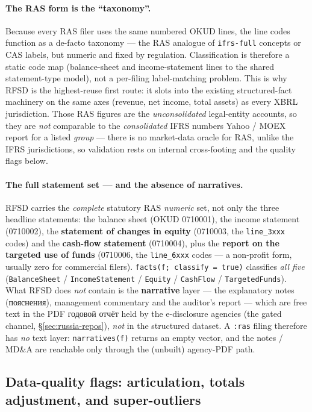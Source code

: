 \documentclass[11pt,a4paper]{report}
\newcommand{\rus}[1]{{\rusfont #1}}
\begin{document}
\paragraph{The RAS form is the ``taxonomy''.} Because every RAS filer uses the same numbered OKUD lines, the
line codes function as a de-facto taxonomy --- the RAS analogue of \texttt{ifrs-full} concepts or CAS labels,
but numeric and fixed by regulation. Classification is therefore a static code map (balance-sheet and
income-statement lines to the shared statement-type model), not a per-filing label-matching problem. This is
why RFSD is the highest-reuse first route: it slots into the existing structured-fact machinery on the same
axes (revenue, net income, total assets) as every XBRL jurisdiction. Those RAS figures are the
\emph{unconsolidated} legal-entity accounts, so they are \emph{not} comparable to the \emph{consolidated}
IFRS numbers Yahoo / MOEX report for a listed \emph{group} --- there is no market-data oracle for RAS,
unlike the IFRS jurisdictions, so validation rests on internal cross-footing and the quality flags below.

\paragraph{The full statement set --- and the absence of narratives.} RFSD carries the \emph{complete}
statutory RAS \emph{numeric} set, not only the three headline statements: the balance sheet (OKUD 0710001),
the income statement (0710002), the \textbf{statement of changes in equity} (0710003, the \texttt{line\_3xxx}
codes) and the \textbf{cash-flow statement} (0710004), plus the \textbf{report on the targeted use of funds}
(0710006, the \texttt{line\_6xxx} codes --- a non-profit form, usually zero for commercial filers).
\texttt{facts(f; classify = true)} classifies \emph{all five} (\texttt{BalanceSheet} / \texttt{IncomeStatement}
/ \texttt{Equity} / \texttt{CashFlow} / \texttt{TargetedFunds}). What RFSD
does \emph{not} contain is the \textbf{narrative} layer --- the explanatory notes (\rus{пояснения}),
management commentary and the auditor's report --- which are free text in the PDF \rus{годовой отчёт} held by
the e-disclosure agencies (the gated channel, \S\ref{sec:russia-repos}), \emph{not} in the structured
dataset. A \texttt{:ras} filing therefore has \emph{no} text layer: \texttt{narratives(f)} returns an empty
vector, and the notes / MD\&A are reachable only through the (unbuilt) agency-PDF path.

\subsection{Data-quality flags: articulation, totals adjustment, and super-outliers}\label{sec:russia-flags}
\end{document}
